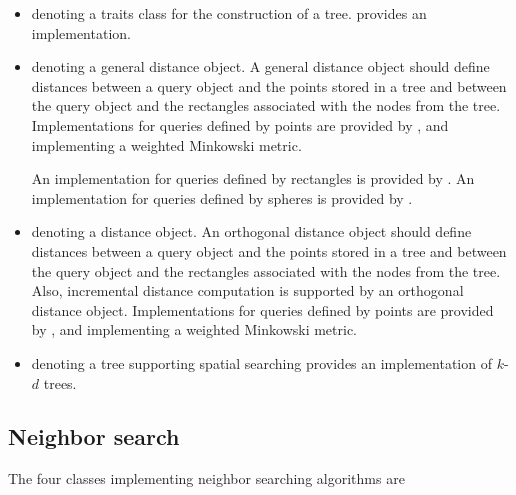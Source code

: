 \begin{itemize}
\item
{} denoting a traits class for the construction of a tree.
 provides an implementation. 

\item
{} denoting a general distance object. A general distance object should define distances between a query object
and the points stored in a tree and between the query object and the rectangles associated with the nodes from the tree.
Implementations for queries defined by points are provided
by , and
 implementing 
a weighted Minkowski metric.

An implementation for queries defined by rectangles is provided by
.
An implementation for queries defined by spheres is provided by
.

\item
{} denoting a distance object. An orthogonal distance object should define distances 
between a query object and the points stored in a tree and between the
query object and the rectangles associated with the nodes from the
tree.  Also, incremental distance computation is supported by an
orthogonal distance object.  Implementations for queries defined by
points are provided by ,
and
 implementing 
a weighted Minkowski metric.

\item
{} denoting a tree supporting spatial searching 
 provides an implementation of $k$-$d$ trees.

\end{itemize}

\subsection{Neighbor search}

The four classes implementing neighbor searching algorithms are


